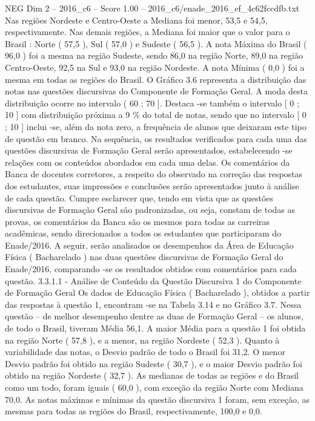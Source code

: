 \begin{textsample}{NEG Dim 2 – 2016\_c6 – Score 1.00 – 2016\_c6/enade\_2016\_ef\_4c62fccdfb.txt}
Nas regiões Nordeste e Centro-Oeste a Mediana foi menor, 53,5 e 54,5, respectivamente.
Nas demais regiões, a Mediana foi maior que o valor para o Brasil : Norte ( 57,5 ), Sul ( 57,0 ) e Sudeste ( 56,5 ).
A nota Máxima do Brasil ( 96,0 ) foi a mesma na região Sudeste, sendo 86,0 na região Norte, 89,0 na região Centro-Oeste, 92,5 na Sul e 93,0 na região Nordeste.
A nota Mínima ( 0,0 ) foi a mesma em todas as regiões do Brasil.
O Gráfico 3.6 representa a distribuição das notas nas questões discursivas do Componente de Formação Geral.
A moda desta distribuição ocorre no intervalo ( 60 ; 70 ].
Destaca -se também o intervalo [ 0 ; 10 ] com distribuição próxima a 9 \% do total de notas, sendo que no intervalo [ 0 ; 10 ] inclui -se, além da nota zero, a frequência de alunos que deixaram este tipo de questão em branco.
Na sequência, os resultados verificados para cada uma das questões discursivas de Formação Geral serão apresentados, estabelecendo -se relações com os conteúdos abordados em cada uma delas.
Os comentários da Banca de docentes corretores, a respeito do observado na correção das respostas dos estudantes, suas impressões e conclusões serão apresentados junto à análise de cada questão.
Cumpre esclarecer que, tendo em vista que as questões discursivas de Formação Geral são padronizadas, ou seja, constam de todas as provas, os comentários da Banca são os mesmos para todas as carreiras acadêmicas, sendo direcionados a todos os estudantes que participaram do Enade/2016.
A seguir, serão analisados os desempenhos da Área de Educação Física ( Bacharelado ) nas duas questões discursivas de Formação Geral do Enade/2016, comparando -se os resultados obtidos com comentários para cada questão. 3.3.1.1 - Análise de Conteúdo da Questão Discursiva 1 do Componente de Formação Geral Os dados de Educação Física ( Bacharelado ), obtidos a partir das respostas à questão 1, encontram -se na Tabela 3.14 e no Gráfico 3.7.
Nessa questão – de melhor desempenho dentre as duas de Formação Geral – os alunos, de todo o Brasil, tiveram Média 56,1.
A maior Média para a questão 1 foi obtida na região Norte ( 57,8 ), e a menor, na região Nordeste ( 52,3 ).
Quanto à variabilidade das notas, o Desvio padrão de todo o Brasil foi 31,2.
O menor Desvio padrão foi obtido na região Sudeste ( 30,7 ), e o maior Desvio padrão foi obtido na região Nordeste ( 32,7 ).
As medianas de todas as regiões e do Brasil como um todo, foram iguais ( 60,0 ), com exceção da região Norte com Mediana 70,0.
As notas máximas e mínimas da questão discursiva 1 foram, sem exceção, as mesmas para todas as regiões do Brasil, respectivamente, 100,0 e 0,0.

\end{textsample}
